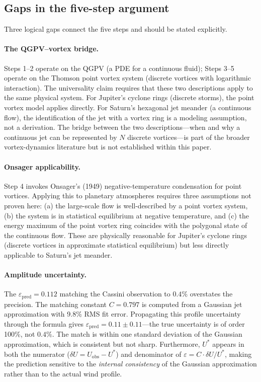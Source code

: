 \subsection{Gaps in the five-step argument}

Three logical gaps connect the five steps and should be stated explicitly.

\paragraph{The QGPV--vortex bridge.}
Steps 1--2 operate on the QGPV (a PDE for a continuous fluid); Steps 3--5
operate on the Thomson point vortex system (discrete vortices with
logarithmic interaction).  The universality claim requires that these two
descriptions apply to the same physical system.  For Jupiter's cyclone
rings (discrete storms), the point vortex model applies directly.  For
Saturn's hexagonal jet meander (a continuous flow), the identification
of the jet with a vortex ring is a modeling assumption, not a derivation.
The bridge between the two descriptions---when and why a continuous jet
can be represented by $N$ discrete vortices---is part of the broader
vortex-dynamics literature \citep{Aref2003} but is not established within
this paper.

\paragraph{Onsager applicability.}
Step 4 invokes Onsager's (1949) negative-temperature condensation for
point vortices.  Applying this to planetary atmospheres requires three
assumptions not proven here: (a) the large-scale flow is well-described
by a point vortex system, (b) the system is in statistical equilibrium
at negative temperature, and (c) the energy maximum of the point vortex
ring coincides with the polygonal state of the continuous flow.  These
are physically reasonable for Jupiter's cyclone rings (discrete vortices
in approximate statistical equilibrium) but less directly applicable to
Saturn's jet meander.

\paragraph{Amplitude uncertainty.}
The $\varepsilon_{\mathrm{pred}} = 0.112$ matching the Cassini
observation to $0.4\%$ overstates the precision.  The matching constant
$C = 0.797$ is computed from a Gaussian jet approximation with 9.8\%
RMS fit error.  Propagating this profile uncertainty through the
formula gives $\varepsilon_{\mathrm{pred}} = 0.11 \pm 0.11$---the
true uncertainty is of order 100\%, not $0.4\%$.  The match is within
one standard deviation of the Gaussian approximation, which is
consistent but not sharp.  Furthermore, $U^*$ appears in both the
numerator ($\delta U = U_{\mathrm{obs}} - U^*$) and denominator of
$\varepsilon = C \cdot \delta U / U^*$, making the prediction
sensitive to the \emph{internal consistency} of the Gaussian
approximation rather than to the actual wind profile.

